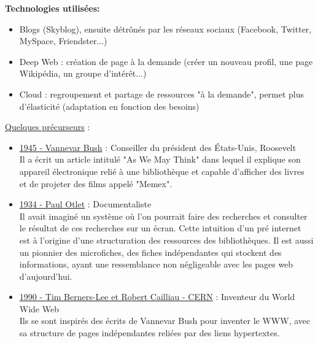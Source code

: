 \vspace{0.3cm}
\textbf{Technologies utilisées:}
    \begin{itemize}
        \item Blogs (Skyblog), ensuite détrônés par les réseaux sociaux (Facebook, Twitter, MySpace, Friendster...)
        \item Deep Web : création de page à la demande (créer un nouveau profil, une page Wikipédia, un groupe d'intérêt...)
        \item Cloud : regroupement et partage de ressources "à la demande", permet plus d'élasticité (adaptation en fonction des besoins)
    \end{itemize}

\vspace{0.5cm}       

\newpage

\vspace * {0.5cm}
    
    \vspace{0.3cm}
    
    \underline{Quelques précurseurs} :
    
    \begin{itemize}
        \item \underline{1945 - Vannevar Bush} : Conseiller du président des États-Unis, Roosevelt\\ 
        Il a écrit un article intitulé "As We May Think" dans lequel il explique son appareil électronique relié à une bibliothèque et capable d'afficher des livres et de projeter des films appelé "Memex".
        \item \underline{1934 - Paul Otlet} : Documentaliste\\ 
        Il avait imaginé un système où l'on pourrait faire des recherches et consulter le résultat de ces recherches sur un écran. Cette intuition d'un pré internet est à l'origine d'une structuration des ressources des bibliothèques. Il est aussi un pionnier des microfiches, des fiches indépendantes qui stockent des informations, ayant une ressemblance non négligeable avec les pages web d'aujourd'hui.
        \item \underline{1990 - Tim Berners-Lee et  Robert Cailliau - CERN} : Inventeur du World Wide Web\\
        Ils se sont inspirés des écrits de Vannevar Bush pour inventer le WWW, avec sa structure de pages indépendantes reliées par des liens hypertextes.
    \end{itemize}
    
